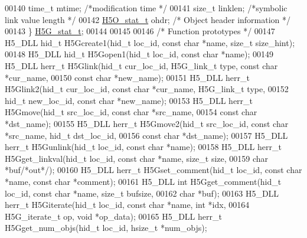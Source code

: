 \begin{DoxyCode}
00140     time\_t      mtime;      \textcolor{comment}{/*modification time     */}
00141     \textcolor{keywordtype}{size\_t}      linklen;    \textcolor{comment}{/*symbolic link value length    */}
00142     \hyperlink{struct_h5_o__stat__t}{H5O\_stat\_t}          ohdr;           \textcolor{comment}{/* Object header information    */}
00143 \} \hyperlink{struct_h5_g__stat__t}{H5G\_stat\_t};
00144 
00145 
00146 \textcolor{comment}{/* Function prototypes */}
00147 H5\_DLL hid\_t H5Gcreate1(hid\_t loc\_id, \textcolor{keyword}{const} \textcolor{keywordtype}{char} *name, \textcolor{keywordtype}{size\_t} size\_hint);
00148 H5\_DLL hid\_t H5Gopen1(hid\_t loc\_id, \textcolor{keyword}{const} \textcolor{keywordtype}{char} *name);
00149 H5\_DLL herr\_t H5Glink(hid\_t cur\_loc\_id, H5G\_link\_t type, \textcolor{keyword}{const} \textcolor{keywordtype}{char} *cur\_name,
00150     \textcolor{keyword}{const} \textcolor{keywordtype}{char} *new\_name);
00151 H5\_DLL herr\_t H5Glink2(hid\_t cur\_loc\_id, \textcolor{keyword}{const} \textcolor{keywordtype}{char} *cur\_name, H5G\_link\_t type,
00152     hid\_t new\_loc\_id, \textcolor{keyword}{const} \textcolor{keywordtype}{char} *new\_name);
00153 H5\_DLL herr\_t H5Gmove(hid\_t src\_loc\_id, \textcolor{keyword}{const} \textcolor{keywordtype}{char} *src\_name,
00154     \textcolor{keyword}{const} \textcolor{keywordtype}{char} *dst\_name);
00155 H5\_DLL herr\_t H5Gmove2(hid\_t src\_loc\_id, \textcolor{keyword}{const} \textcolor{keywordtype}{char} *src\_name, hid\_t dst\_loc\_id,
00156     \textcolor{keyword}{const} \textcolor{keywordtype}{char} *dst\_name);
00157 H5\_DLL herr\_t H5Gunlink(hid\_t loc\_id, \textcolor{keyword}{const} \textcolor{keywordtype}{char} *name);
00158 H5\_DLL herr\_t H5Gget\_linkval(hid\_t loc\_id, \textcolor{keyword}{const} \textcolor{keywordtype}{char} *name, \textcolor{keywordtype}{size\_t} size,
00159     \textcolor{keywordtype}{char} *buf\textcolor{comment}{/*out*/});
00160 H5\_DLL herr\_t H5Gset\_comment(hid\_t loc\_id, \textcolor{keyword}{const} \textcolor{keywordtype}{char} *name, \textcolor{keyword}{const} \textcolor{keywordtype}{char} *comment);
00161 H5\_DLL \textcolor{keywordtype}{int} H5Gget\_comment(hid\_t loc\_id, \textcolor{keyword}{const} \textcolor{keywordtype}{char} *name, \textcolor{keywordtype}{size\_t} bufsize,
00162     \textcolor{keywordtype}{char} *buf);
00163 H5\_DLL herr\_t H5Giterate(hid\_t loc\_id, \textcolor{keyword}{const} \textcolor{keywordtype}{char} *name, \textcolor{keywordtype}{int} *idx,
00164         H5G\_iterate\_t op, \textcolor{keywordtype}{void} *op\_data);
00165 H5\_DLL herr\_t H5Gget\_num\_objs(hid\_t loc\_id, hsize\_t *num\_objs);

\end{DoxyCode}
